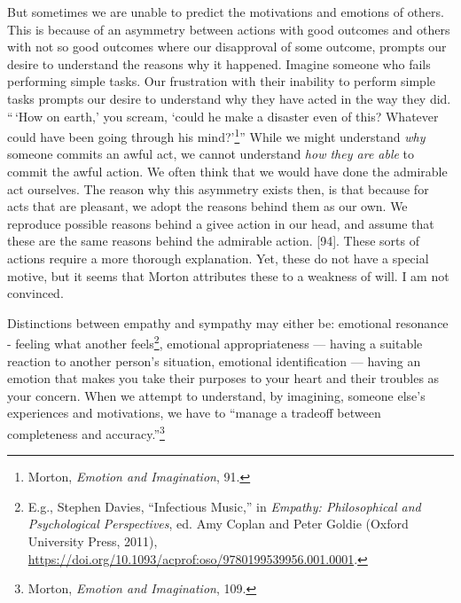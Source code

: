 \documentclass[phdthesis,12pt,final,a4paper]{wuthesis}
\theoremstyle{definition}
\theoremstyle{definition}
\theoremstyle{definition}
\theoremstyle{definition}
\theoremstyle{remark}
\begin{document}
But sometimes we are unable to predict the motivations and emotions of others. This is because of an asymmetry between actions with good outcomes and others
with not so good outcomes where our disapproval of some outcome, prompts our desire to understand the reasons why it happened. Imagine someone who fails performing simple tasks. Our frustration with their inability to perform simple tasks prompts our desire to understand why they have acted in the way they did. ``\,`How on earth,' you scream, `could he make a disaster even of this? Whatever could have been going through his mind?'\footnote{Morton, \emph{Emotion and {Imagination}}, 91.}'' While we might understand \emph{why} someone commits an awful act, we cannot understand \emph{how they are able} to commit the awful action. We often think that we would have done the admirable act ourselves. The reason why this asymmetry exists then, is that because for acts that are pleasant, we adopt the reasons behind them as our own. We reproduce possible reasons behind a givee action in our head, and assume that these are the same reasons behind the admirable action.
{[}94{]}. These sorts of actions require a more thorough explanation. Yet, these do not have a special motive, but it seems that Morton attributes these to a weakness of will. I am not convinced.

Distinctions between empathy and sympathy may either be: emotional resonance - feeling what another feels\footnote{E.g., Stephen Davies, {``Infectious {Music},''} in \emph{Empathy: {Philosophical} and {Psychological Perspectives}}, ed. Amy Coplan and Peter Goldie (Oxford University Press, 2011), \url{https://doi.org/10.1093/acprof:oso/9780199539956.001.0001}.}, emotional appropriateness --- having a suitable reaction to another person's situation, emotional identification --- having an emotion that makes you take their purposes to your heart
and their troubles as your concern. When we attempt to understand, by imagining, someone else's experiences and motivations, we have to
``manage a tradeoff between completeness and accuracy.''\footnote{Morton, \emph{Emotion and {Imagination}}, 109.}
\end{document}
